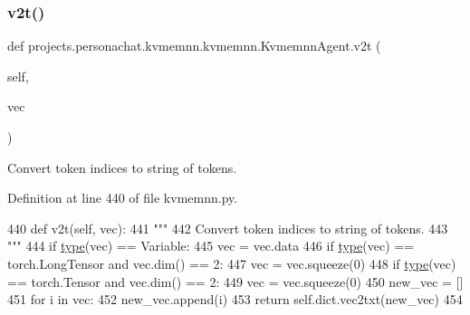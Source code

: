 \subsubsection{\texorpdfstring{v2t()}{v2t()}}
{\footnotesize\ttfamily def projects.\+personachat.\+kvmemnn.\+kvmemnn.\+Kvmemnn\+Agent.\+v2t (\begin{DoxyParamCaption}\item[{}]{self,  }\item[{}]{vec }\end{DoxyParamCaption})}

\begin{DoxyVerb}Convert token indices to string of tokens.
\end{DoxyVerb}
 

Definition at line 440 of file kvmemnn.\+py.


\begin{DoxyCode}
440     \textcolor{keyword}{def }v2t(self, vec):
441         \textcolor{stringliteral}{"""}
442 \textcolor{stringliteral}{        Convert token indices to string of tokens.}
443 \textcolor{stringliteral}{        """}
444         \textcolor{keywordflow}{if} \hyperlink{namespaceparlai_1_1agents_1_1tfidf__retriever_1_1build__tfidf_ad5dfae268e23f506da084a9efb72f619}{type}(vec) == Variable:
445             vec = vec.data
446         \textcolor{keywordflow}{if} \hyperlink{namespaceparlai_1_1agents_1_1tfidf__retriever_1_1build__tfidf_ad5dfae268e23f506da084a9efb72f619}{type}(vec) == torch.LongTensor \textcolor{keywordflow}{and} vec.dim() == 2:
447             vec = vec.squeeze(0)
448         \textcolor{keywordflow}{if} \hyperlink{namespaceparlai_1_1agents_1_1tfidf__retriever_1_1build__tfidf_ad5dfae268e23f506da084a9efb72f619}{type}(vec) == torch.Tensor \textcolor{keywordflow}{and} vec.dim() == 2:
449             vec = vec.squeeze(0)
450         new\_vec = []
451         \textcolor{keywordflow}{for} i \textcolor{keywordflow}{in} vec:
452             new\_vec.append(i)
453         \textcolor{keywordflow}{return} self.dict.vec2txt(new\_vec)
454 
\end{DoxyCode}
\mbox{\label{classprojects_1_1personachat_1_1kvmemnn_1_1kvmemnn_1_1KvmemnnAgent_a7c6b549658b7ee5148af60c180e803b1}} 
